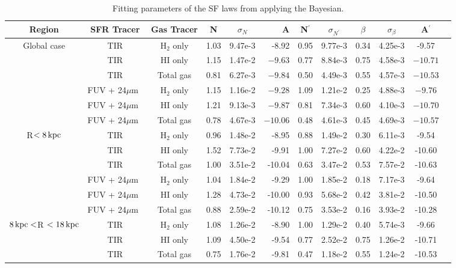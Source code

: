 \documentclass[useAMS,usenatbib]{mn2e}
\newcommand \kpc        {\,{\rm kpc}}
\newcommand \um    {$\mu$m\ }
\newcommand \nprime {N$^\prime$}
\newcommand \eqnprime {N^\prime}
\begin{document}
\begin{table*}
\caption{Fitting parameters of the SF laws from applying the Bayesian.}
\label{table:res}
\begin{tabular}{||cc||cccrcccccr}
\hline\hline
\multicolumn{1}{||c||}{\multirow{1}{*}{Region}} & SFR Tracer& Gas Tracer & N & $\sigma_N$ & A & \nprime & $\sigma_{\eqnprime}$ & $\beta$ & $\sigma_\beta$ & A$^\prime$& \\
\hline
\multicolumn{1}{||c||}{\multirow{6}{*}{Global case}} & TIR & H$_2$ only & 1.03 & 9.47e-3  & -8.92  & 0.95 & 9.77e-3 & 0.34 & 4.25e-3 & -9.57  \\
 & TIR         & HI only    & 1.15 & 1.47e-2 & $-9.63$  & 0.77 & 8.84e-3 & 0.75 & 4.58e-3 & $-10.71$ \\
 & TIR         & Total gas  & 0.81 & 6.27e-3 & $-9.84$  & 0.50 & 4.49e-3 & 0.55 & 4.57e-3 & $-10.53$\\
 & FUV + 24\um & H$_2$ only & 1.15 & 1.16e-2 & $-9.28$  & 1.09 & 1.21e-2 & 0.25 & 4.88e-3 & $-9.76$  \\
 & FUV + 24\um & HI only    & 1.21 & 9.13e-3 & $-9.87$  & 0.81 & 7.34e-3 & 0.60 & 4.10e-3 & $-10.70$ \\
 & FUV + 24\um & Total gas  & 0.78 & 4.67e-3 & $-10.06$ & 0.48 & 4.61e-3 & 0.45 & 4.69e-3 & $-10.57$ \\
\hline
\multicolumn{1}{||c||}{\multirow{6}{*}{R$< 8\kpc$}}& TIR & H$_2$ only & 0.96 & 1.48e-2 & -8.95  & 0.88 & 1.49e-2 & 0.30 & 6.11e-3 & -9.54  \\
 & TIR         & HI only    & 1.52 & 7.73e-2  & -9.91  & 1.00 & 7.27e-2  & 0.60 & 4.22e-2  & -10.60 \\
 & TIR         & Total gas  & 1.00 & 3.51e-2  & -10.04 & 0.63 & 3.47e-2  & 0.53 & 7.57e-2  & -10.63 \\
 & FUV + 24\um & H$_2$ only & 1.04 & 1.84e-2 & -9.29  & 1.00 & 1.85e-2 & 0.18 & 7.17e-3 & -9.64  \\
 & FUV + 24\um & HI only    & 1.28 & 4.73e-2  & -10.00 & 0.93 & 5.68e-2  & 0.42 & 3.81e-2  & -10.50 \\
 & FUV + 24\um & Total gas  & 0.88 & 2.59e-2  & -10.12 & 0.75 & 3.53e-2  & 0.16 & 3.93e-2  & -10.28 \\
\hline
\multicolumn{1}{||c||}{\multirow{6}{*}{$8\kpc < $R $< 18\kpc$}} & TIR & H$_2$ only & 1.08 & 1.26e-2 & -8.90  & 1.00 & 1.29e-2 & 0.40 & 5.74e-3 & -9.66  \\
 & TIR         & HI only    & 1.09 & 4.50e-2 & -9.54  & 0.77 & 2.52e-2  & 0.75 & 1.26e-2  & -10.71 \\
 & TIR         & Total gas  & 0.75 & 1.76e-2  & -9.81  & 0.47 & 1.18e-2  & 0.55 & 1.24e-2  & -10.53 \\

\end{tabular}
\end{table*}
\end{document}
